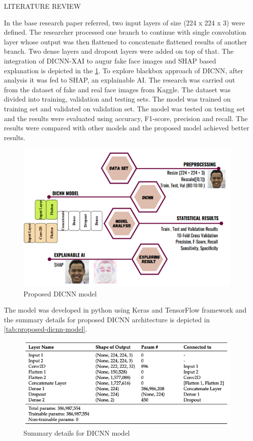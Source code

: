 \begin{section}[]{\uppercase{Literature Review}}
\par In the base research paper \cite{Bhandari2023} referred, two input layers of size (224 x 224 x 3) were defined. The researcher processed one branch to continue with single convolution layer whose output was then flattened to concatenate flattened results of another branch. Two dense layers and dropout layers were added on top of that.
The integration of DICNN-XAI to augur fake face images and SHAP based explanation is depicted in the \ref*{fig:proposed-dicnn}. To explore blackbox approach of DICNN, after analysis it was fed to SHAP, an explainable AI.
The research was carried out from the dataset of fake and real face images from Kaggle. The dataset was divided into training, validation and testing sets. The model was trained on training set and validated on validation set. The model was tested on testing set and the results were evaluated using accuracy, F1-score, precision and recall. The results were compared with other models and the proposed model achieved better results.
\begin{figure}[htbp]
    \centering
    \includegraphics[width=\linewidth]{images/proposed-dicnn.png}
    \caption{Proposed DICNN model}
    \label{fig:proposed-dicnn}
\end{figure}

The model was developed in python using Keras and TensorFlow framework and the summary details for proposed DICNN architecture is depicted in \ref{tab:proposed-dicnn-model}.
 
\begin{figure}
    \centering
    \includegraphics[width=\linewidth]{images/model-reference.png}
    \caption{Summary details for DICNN model}
    \label{fig:model-reference}
\end{figure}


\end{section}

